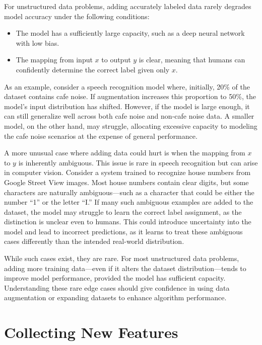 \documentclass[12pt,openany]{book}
\begin{document}
For unstructured data problems, adding accurately labeled data rarely degrades model accuracy under the following conditions:
\begin{itemize}
    \item The model has a sufficiently large capacity, such as a deep neural network with low bias.
    \item The mapping from input $x$ to output $y$ is clear, meaning that humans can confidently determine the correct label given only $x$.
\end{itemize}

As an example, consider a speech recognition model where, initially, 20\% of the dataset contains cafe noise. If augmentation increases this proportion to 50\%, the model’s input distribution has shifted. However, if the model is large enough, it can still generalize well across both cafe noise and non-cafe noise data. A smaller model, on the other hand, may struggle, allocating excessive capacity to modeling the cafe noise scenarios at the expense of general performance. \newline

A more unusual case where adding data could hurt is when the mapping from $x$ to $y$ is inherently ambiguous. This issue is rare in speech recognition but can arise in computer vision. Consider a system trained to recognize house numbers from Google Street View images. Most house numbers contain clear digits, but some characters are naturally ambiguous—such as a character that could be either the number “1” or the letter “I.” If many such ambiguous examples are added to the dataset, the model may struggle to learn the correct label assignment, as the distinction is unclear even to humans. This could introduce uncertainty into the model and lead to incorrect predictions, as it learns to treat these ambiguous cases differently than the intended real-world distribution. \newline

While such cases exist, they are rare. For most unstructured data problems, adding more training data—even if it alters the dataset distribution—tends to improve model performance, provided the model has sufficient capacity. Understanding these rare edge cases should give confidence in using data augmentation or expanding datasets to enhance algorithm performance.


\section{Collecting New Features}
\end{document}
